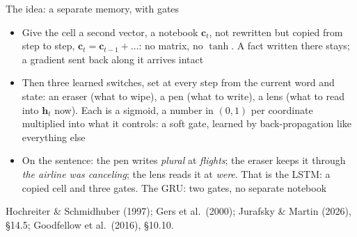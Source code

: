 \documentclass[aspectratio=169, 11pt]{beamer}
\newcommand{\srcline}[1]{%
  \par\vspace{0.25em}%
  {\scriptsize\color{mcMuted}\hfill #1\par}}
\newcommand{\src}[3]{}      %
\begin{document}
\begin{frame}{The idea: a separate memory, with gates}
  \src{jurafsky_slp3}{section}{14.5}
  \src{goodfellow2016}{section}{10.10}
  \src{hochreiter1997}{section}{4.1}
  \vspace{-0.3em}
  {\footnotesize
  \begin{itemize}\itemsep0.25em
    \item Give the cell a second vector, a \alert{notebook} $\mathbf{c}_t$,
          not rewritten but \alert{copied} from step to step,
          $\mathbf{c}_t = \mathbf{c}_{t-1} + \ldots$: no matrix, no $\tanh$. A fact
          written there stays; a gradient sent back along it arrives intact
    \item Then three learned \alert{switches}, set at every step from the
          current word and state: an \alert{eraser} (what to wipe), a
          \alert{pen} (what to write), a \alert{lens} (what to read into
          $\mathbf{h}_t$ now). Each is a sigmoid, a number in $(0, 1)$ per
          coordinate multiplied into what it controls: a soft \alert{gate},
          learned by back-propagation like everything else
    \item On the sentence: the pen writes \emph{plural} at \emph{flights};
          the eraser keeps it through \emph{the airline was canceling}; the
          lens reads it at \emph{were}. That is the LSTM: a copied cell and
          three gates. The GRU: two gates, no separate notebook
  \end{itemize}}
  \srcline{Hochreiter \& Schmidhuber (1997); Gers et al.\ (2000); Jurafsky \& Martin (2026), \S14.5; Goodfellow et al.\ (2016), \S10.10.}
\end{frame}
\end{document}
